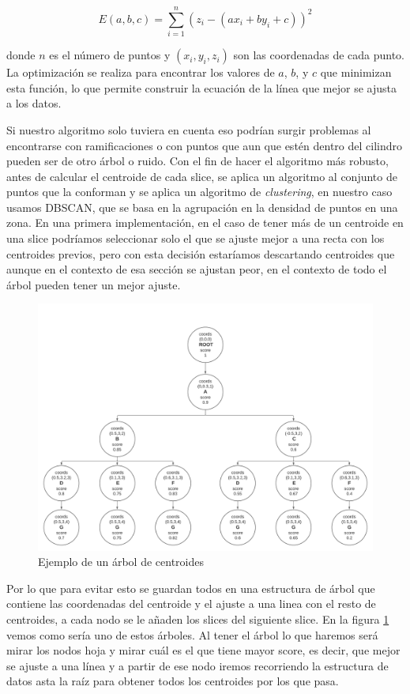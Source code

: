 \[
E(a, b, c) = \sum_{i=1}^{n} (z_i - (ax_i + by_i + c))^2
\]

donde $n$ es el número de puntos y $(x_i, y_i, z_i)$ son las coordenadas de cada punto. La optimización se realiza para encontrar los valores de $a$, $b$, y $c$ que minimizan esta función, lo que permite construir la ecuación de la línea que mejor se ajusta a los datos.

Si nuestro algoritmo solo tuviera en cuenta eso podrían surgir problemas al encontrarse con ramificaciones o con puntos que aun que estén dentro del cilindro pueden ser de otro árbol o ruido. 
Con el fin de hacer el algoritmo más robusto, antes de calcular el centroide de cada slice, se aplica un algoritmo al conjunto de puntos que la conforman y se aplica un algoritmo de \textit{clustering}, en nuestro caso usamos DBSCAN, que se basa en la agrupación en la densidad de puntos en una zona. En una primera implementación, en el caso de tener más de un centroide en una slice podríamos seleccionar solo el que se ajuste mejor a una recta con los centroides previos, pero con esta decisión estaríamos descartando centroides que aunque en el contexto de esa sección se ajustan peor, en el contexto de todo el árbol pueden tener un mejor ajuste.

\begin{figure}[h]
\centering
    \includegraphics[width=13cm]{imaxes/Diagrama_arb.png}
    \caption{Ejemplo de un árbol de centroides}
    \label{fig:diagFlujoarb}
\end{figure}


Por lo que para evitar esto se guardan todos en una estructura de árbol que contiene las coordenadas del centroide y el ajuste a una linea con el resto de centroides, a cada nodo se le añaden los slices del siguiente slice. 
En la figura \ref{fig:diagFlujoarb} vemos como sería uno de estos árboles. Al tener el árbol lo que haremos será mirar los nodos hoja y mirar cuál es el que tiene mayor score, es decir, que mejor se ajuste a una línea y a partir de ese nodo iremos recorriendo la estructura de datos asta la raíz para obtener todos los centroides por los que pasa.

